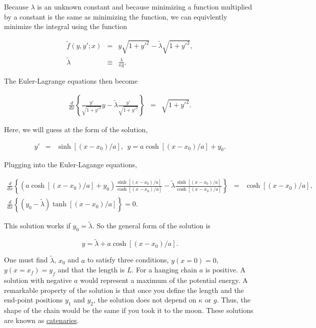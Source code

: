 \documentclass[%
oneside,                 %
final,                   %
10pt]{article}
\begin{document}
Because $\lambda$ is an unknown constant and because minimizing a
function multiplied by a constant is the same as minimizing the
function, we can equivlently minimize the integral using the function

\begin{eqnarray}
\tilde{f}(y,y';x)&=&y\sqrt{1+y'^2}-\tilde{\lambda}\sqrt{1+y'^2},\\
\nonumber
\tilde{\lambda}&\equiv&\frac{\lambda}{\kappa g}.
\end{eqnarray}

The Euler-Lagrange equations then become

\begin{eqnarray*}
\frac{d}{dx}\left\{
\frac{y'}{\sqrt{1+y'^2}}y-\tilde{\lambda}\frac{y'}{\sqrt{1+y'^2}}
\right\}&=&\sqrt{1+y'^2}.
\end{eqnarray*}

Here, we will guess at the form of the solution,

\begin{eqnarray*}
y'&=&\sinh[(x-x_0)/a],~~y=a\cosh[(x-x_0)/a]+y_0.
\end{eqnarray*}

Plugging into the Euler-Lagange equations,

\begin{eqnarray*}
\frac{d}{dx}\left\{(a\cosh[(x-x_0)/a]+y_0)\frac{\sinh[(x-x_0)/a]}{\cosh[(x-x_0)/a]}-\tilde{\lambda}\frac{\sinh[(x-x_0)/a]}{\cosh[(x-x_0)/a]}\right\}&=&\cosh[(x-x_0)/a],\\
\nonumber
\frac{d}{dx}\left\{(y_0-\tilde{\lambda})\tanh[(x-x_0)/a]\right\}=0.
\end{eqnarray*}

This solution works if $y_0=\tilde{\lambda}$. So the general form of
the solution is

\[
y=\tilde{\lambda}+a\cosh[(x-x_0)/a].
\]

One must find $\tilde{\lambda}$, $x_0$ and $a$ to satisfy three
conditions, $y(x=0)=0$, $y(x=x_f)=y_f$ and that the length is $L$. For
a hanging chain $a$ is positive. A solution with negative $a$ would
represent a maximum of the potential energy. A remarkable property of
the solution is that once you define the length and the end-point
positions $y_1$ and $y_2$, the solution does not depend on $\kappa$ or
$g$. Thus, the shape of the chain would be the same if you took it to
the moon. These solutions are known as \href{{http://en.wikipedia.org/wiki/Catenary}{http://en.wikipedia.org/wiki/Catenary}}{catenaries}.
\end{document}
